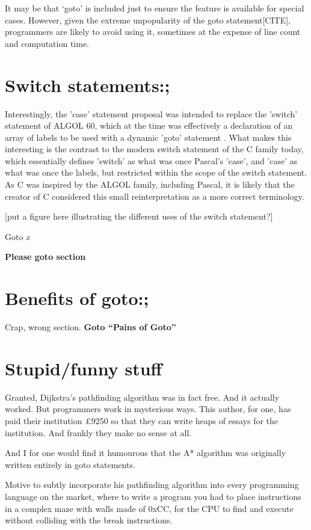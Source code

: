 \documentclass{journal}
\begin{document}
It may be that `goto' is included just to ensure the feature is available for special cases. However, given the extreme unpopularity of the goto statement[CITE], programmers are likely to avoid using it, sometimes at the expense of line count and computation time.

\section{Switch statements:;}
Interestingly, the 'case' statement proposal was intended to replace the 'switch' statement of ALGOL 60, which at the time was effectively a declaration of an array of labels to be used with a dynamic 'goto' statement \cite{algolguide}. What makes this interesting is the contrast to the modern switch statement of the C family today, which essentially defines 'switch' as what was once Pascal's 'case', and 'case' as what was once the labels, but restricted within the scope of the switch statement. As C was inspired by the ALGOL family, including Pascal, it is likely that the creator of C considered this small reinterpretation as a more correct terminology.

[put a figure here illustrating the different uses of the switch statement?]

Goto \textit{x}

\textbf{Please goto section }

\section{Benefits of goto:;}
Crap, wrong section. \textbf{Goto ``Pains of Goto''}

\section{Stupid/funny stuff}
Granted, Dijkstra's pathfinding algorithm was in fact free. And it actually worked. But programmers work in mysterious ways. This author, for one, has paid their institution £9250 so that they can write heaps of essays for the institution. And frankly they make no sense at all.

And I for one would find it humourous that the A* algorithm was originally written entirely in goto statements.

Motive to subtly incorporate his pathfinding algorithm into every programming language on the market, where to write a program you had to place instructions in a complex maze with walls made of 0xCC, for the CPU to find and execute without colliding with the break instructions.
\end{document}
